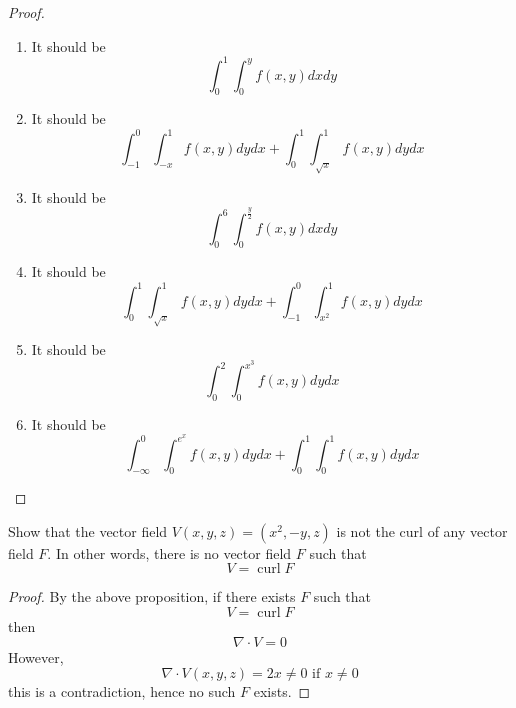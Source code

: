 \documentclass[openany]{book}
\newcommand{\curl}{\operatorname{curl}}
\begin{document}
\begin{proof}
    \begin{enumerate}
        \item It should be 
        \begin{equation*}
            \int_0^1\int_0^yf(x,y)dxdy
        \end{equation*}
        \item It should be 
        \begin{equation*}
            \int_{-1}^0\int_{-x}^{1}f(x,y)dydx+\int_{0}^1\int_{\sqrt{x}}^1f(x,y)dydx
        \end{equation*}
        \item It should be 
        \begin{equation*}
            \int_0^6\int_0^{\frac{y}{2}}f(x,y)dxdy
        \end{equation*}
        \item It should be \begin{equation*}
            \int_0^1\int_{\sqrt{x}}^1f(x,y)dydx+\int_{-1}^0\int_{x^2}^1f(x,y)dydx
        \end{equation*}
        \item It should be 
        \begin{equation*}
            \int_0^2\int_0^{x^3}f(x,y)dydx
        \end{equation*}
        \item It should be 
        \begin{equation*}
            \int_{-\infty}^0\int_0^{e^x}f(x,y)dydx+\int_0^1\int_0^1f(x,y)dydx
        \end{equation*}
    \end{enumerate}
\end{proof}

\begin{prob}
    Show that the vector field $V(x,y,z)=(x^2, -y, z)$ is not the curl of any vector field $F$. In other words, there is no vector field $F$ such that 
    \begin{equation*}
        V=\curl F
    \end{equation*}
\end{prob}
\begin{proof}
    By the above proposition, if there exists $F$ such that 
    \begin{equation*}
        V=\curl F
    \end{equation*}
    then 
    \begin{equation*}
        \nabla\cdot V=0
    \end{equation*}
    However, 
    \begin{equation*}
        \nabla\cdot V(x,y,z)=2x\neq 0 \text{ if } x\neq 0
    \end{equation*}
    this is a contradiction, hence no such $F$ exists.
\end{proof}
\end{document}
